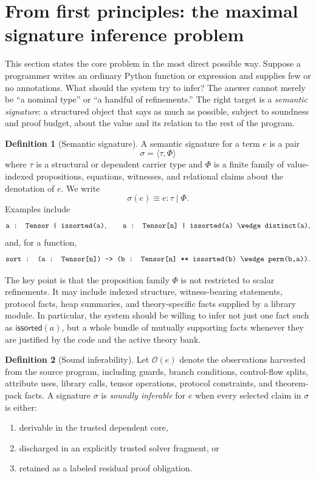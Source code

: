 \documentclass[11pt]{article}
\newcommand{\py}[1]{\texttt{\detokenize{#1}}}
\theoremstyle{definition}
\newtheorem{definition}{Definition}[section]
\theoremstyle{plain}
\begin{document}
\section{From first principles: the maximal signature inference problem}

This section states the core problem in the most direct possible way. Suppose a
programmer writes an ordinary Python function or expression and supplies few or
no annotations. What should the system try to infer? The answer cannot merely be
``a nominal type'' or ``a handful of refinements.'' The right target is a
\emph{semantic signature}: a structured object that says as much as possible,
subject to soundness and proof budget, about the value and its relation to the
rest of the program.

\begin{definition}[Semantic signature]
A semantic signature for a term $e$ is a pair
\[
\sigma = \langle \tau, \Phi \rangle
\]
where $\tau$ is a structural or dependent carrier type and $\Phi$ is a finite
family of value-indexed propositions, equations, witnesses, and relational
claims about the denotation of $e$. We write
\[
\sigma(e) \equiv e : \tau \mid \Phi.
\]
Examples include
\[
\py{a : Tensor | issorted(a)},
\qquad
\py{a : Tensor[n] | issorted(a) \wedge distinct(a)},
\]
and, for a function,
\[
\py{sort : (a : Tensor[n]) -> (b : Tensor[n] ** issorted(b) \wedge perm(b,a))}.
\]
\end{definition}

The key point is that the proposition family $\Phi$ is not restricted to scalar
refinements. It may include indexed structure, witness-bearing statements,
protocol facts, heap summaries, and theory-specific facts supplied by a library
module. In particular, the system should be willing to infer not just one fact
such as \(\mathsf{issorted}(a)\), but a whole bundle of mutually supporting
facts whenever they are justified by the code and the active theory bank.

\begin{definition}[Sound inferability]
Let $\mathcal{O}(e)$ denote the observations harvested from the source program,
including guards, branch conditions, control-flow splits, attribute uses,
library calls, tensor operations, protocol constraints, and theorem-pack facts.
A signature $\sigma$ is \emph{soundly inferable} for $e$ when every selected
claim in $\sigma$ is either:
\begin{enumerate}[label=\arabic*.]
  \item derivable in the trusted dependent core,
  \item discharged in an explicitly trusted solver fragment, or
  \item retained as a labeled residual proof obligation.
\end{enumerate}
\end{definition}
\end{document}
